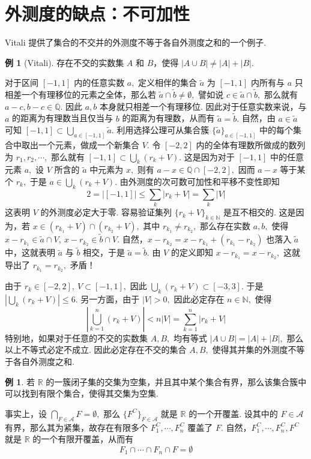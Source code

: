 \documentclass[12pt, a4paper, oneside]{book}
\numberwithin{figure}{section}
\theoremstyle{definition}
\newtheorem{example}[theorem]{例}
\begin{document}
\section{外测度的缺点：不可加性} Vitali 提供了集合的不交并的外测度不等于各自外测度之和的一个例子. 
\begin{example}[Vitali]\label{ex:non_additivity_of_outer_measure}
    存在不交的实数集 $A$ 和 $B$，使得 $|A\cup B|\neq |A|+|B|.$
\end{example}
对于区间 $[-1,1]$ 内的任意实数 $a,$ 定义相伴的集合 $\tilde a$ 为 $[-1,1]$ 内所有与 $a$ 只相差一个有理移位的元素之全体，那么若 $\tilde a\cap\tilde b\neq \emptyset,$ 譬如说 $c\in\tilde a\cap\tilde b,$ 那么就有 
$a-c,b-c\in\mathbb Q.$ 因此 $a,b$ 本身就只相差一个有理移位. 因此对于任意实数来说，与 $a$ 的距离为有理数当且仅当与 $b$ 的距离为有理数，从而有 $\tilde a=\tilde b.$ 
自然，由 $a\in\tilde a$ 可知 $[-1,1]\subset \bigcup_{a\in [-1,1]}\tilde a.$ 利用选择公理可从集合簇 $\{\tilde a\}_{a\in [-1,1]}$ 中的每个集合中取出一个元素，做成一个新集合 $V.$ 令 $[-2,2]$ 内的全体有理数所做成的数列为 $r_1,r_2,\cdots,$ 
那么就有 $[-1,1]\subset\bigcup_{k} (r_k+V).$ 这是因为对于 $[-1,1]$ 中的任意元素 $a,$ 设 $V$ 所含的 $\tilde a$ 中元素为 $x,$ 则有 $a-x\in\mathbb Q\cap [-2,2],$ 因而 $a-x$ 等于某个 $r_k,$ 于是 $a\in \bigcup_{k} (r_k+V).$ 
由外测度的次可数可加性和平移不变性即知
\begin{equation}
    2=|[-1,1]|\leq\sum_k |r_k+V|=\sum_k |V|
\end{equation}
这表明 $V$ 的外测度必定大于零. 容易验证集列 $\{r_k+V\}_{k\in\mathbb N}$ 是互不相交的. 这是因为，若 $x\in (r_{k_1}+V)\cap (r_{k_2}+V),$ 其中 $r_{k_1}\neq r_{k_2},$ 那么存在实数 $a,b,$ 使得 $x-r_{k_1}\in \tilde a\cap V,\ x-r_{k_2}\in\tilde b\cap V.$ 自然，$x-r_{k_2}=x-r_{k_1}+(r_{k_1}-r_{k_2})$ 也落入 $\tilde a$ 中，这就表明 $\tilde a$ 与 $\tilde b$ 相交，于是 $\tilde a=\tilde b.$ 由 $V$ 的定义即知 $x-r_{k_1}=x-r_{k_2},$ 这就导出了 $r_{k_1}=r_{k_2},$ 矛盾！

由于 $r_k\in [-2,2],\ V\subset [-1,1],$ 因此 $\bigcup_k (r_k+V)\subset [-3,3].$ 于是 $|\bigcup_k (r_k+V)|\leq 6.$ 另一方面，由于 $|V|>0,$ 因此必定存在 $n\in\mathbb N,$ 使得 
\begin{equation}
    \left|\bigcup_{k=1}^n (r_k+V)\right|< n|V|=\sum_{k=1}^n |r_k+V|
\end{equation}
特别地，如果对于任意的不交的实数集 $A,B,$ 均有等式 $|A\cup B|=|A|+|B|,$ 那么以上不等式必定不成立. 因此必定存在不交的集合 $A,B,$ 使得其并集的外测度不等于各自外测度之和.

\begin{example}
    若 $\mathbb R$ 的一簇闭子集的交集为空集，并且其中某个集合有界，那么该集合簇中可以找到有限个集合，使得其交集为空集.
\end{example}
事实上，设 $\bigcap_{F\in\mathcal A}F=\emptyset,$ 那么 $\{F^C\}_{F\in\mathcal A}$ 就是 $\mathbb R$ 的一个开覆盖. 设其中的 $F\in \mathcal A$ 有界，那么其为紧集，故存在有限多个 $F_1^C,\cdots,F_n^C$ 覆盖了 $F.$ 自然，$F_1^C,\cdots,F_n^C,F^C$ 就是 $\mathbb R$ 的一个有限开覆盖，从而有 
\begin{equation}
    F_1\cap\cdots\cap F_n\cap F=\emptyset
\end{equation}
\end{document}

